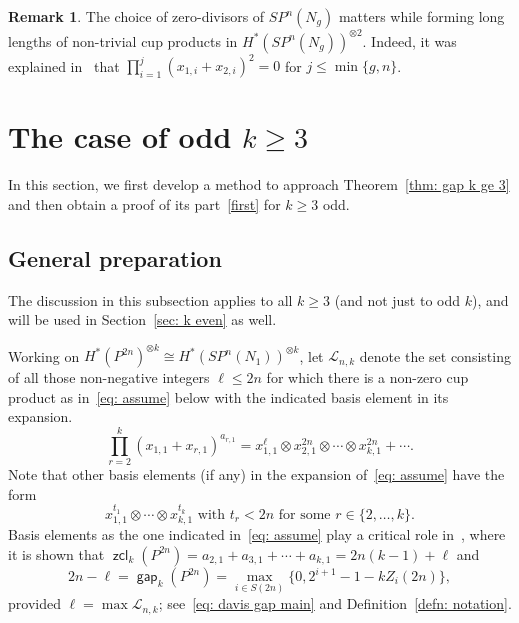 \documentclass[amscd,amssymb,verbatim,10pt]{amsart}
\numberwithin{equation}{section}
\theoremstyle{plain}
\theoremstyle{definition}
\newtheorem{remark}[thm]{Remark}
\DeclareMathOperator{\zcl}{{\mathsf{zcl}}}
\DeclareMathOperator{\gap}{{\mathsf{gap}}}
\begin{document}
\begin{remark}\label{rem: bad zero divisors}
    The choice of zero-divisors of $SP^n(N_g)$ matters while forming long lengths of non-trivial cup products in $H^*(SP^n(N_g))^{\otimes 2}$. Indeed, it was explained in~\cite[Section 6.C]{Ja} that $\prod_{i=1}^j(x_{1,i}+x_{2,i})^2=0$ for $j\le\min\{g,n\}$. 
\end{remark}


\section{The case of odd $k\ge 3$}\label{sec: k odd}

In this section, we first develop a method to approach Theorem~\ref{thm: gap k ge 3} and then obtain a proof of its part~\eqref{first} for $k\ge 3$ odd. 

\subsection{General preparation}\label{subsec: prep}
The discussion in this subsection applies to all $k\ge 3$ (and not just to odd $k$), and will be used in Section~\ref{sec: k even} as well.

Working on $H^*(P^{2n})^{\otimes k}\cong H^*(SP^n(N_1))^{\otimes k}$, let $\mathcal{L}_{n,k}$ denote the set consisting of all those non-negative integers $\ell\leq2n$ for which there is a non-zero cup product as in~\eqref{eq: assume} below with the indicated basis element in its expansion.
\begin{equation}\label{eq: assume}
\prod_{r=2}^k\left(x_{1,1}+x_{r,1}\right)^{a_{r,1}}
=x_{1,1}^{\ell}\otimes x_{2,1}^{2n} \otimes\cdots\otimes x_{k,1}^{2n}+\cdots.    
\end{equation}
Note that other basis elements (if any) in the expansion of~\eqref{eq: assume} have the form
\begin{equation}\label{laforma}
x_{1,1}^{t_1}\otimes\cdots\otimes x_{k,1}^{t_k} \text{ with } t_r<2n \text{ for some }r\in\{2,\ldots, k\}.
\end{equation} 
Basis elements as the one indicated in~\eqref{eq: assume} play a critical role in~\cite{Dav}, where it is shown that $\zcl_k(P^{2n})= a_{2,1}+a_{3,1}+\cdots+a_{k,1}=2n(k-1)+\ell$ and
\begin{equation}\label{probadoporDon}
2n-\ell= \gap_k(P^{2n})=\max_{i\in S(2n)}\{0,2^{i+1}-1-kZ_i(2n)\},    
\end{equation}
provided $\ell=\max\mathcal{L}_{n,k}$; see~\eqref{eq: davis gap main} and Definition~\ref{defn: notation}.
\end{document}
